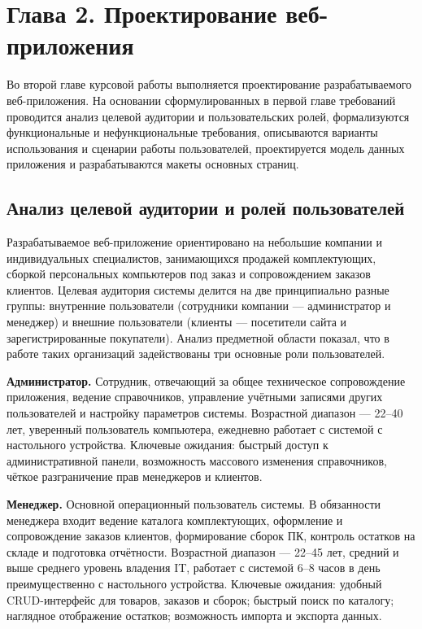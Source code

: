 \documentclass[14pt, a4paper]{extarticle}
\begin{document}
\section*{Глава 2. Проектирование веб-приложения}

Во второй главе курсовой работы выполняется проектирование разрабатываемого веб-приложения. На основании сформулированных в первой главе требований проводится анализ целевой аудитории и пользовательских ролей, формализуются функциональные и нефункциональные требования, описываются варианты использования и сценарии работы пользователей, проектируется модель данных приложения и разрабатываются макеты основных страниц.

\subsection{Анализ целевой аудитории и ролей пользователей}

Разрабатываемое веб-приложение ориентировано на небольшие компании и индивидуальных специалистов, занимающихся продажей комплектующих, сборкой персональных компьютеров под заказ и сопровождением заказов клиентов. Целевая аудитория системы делится на две принципиально разные группы: внутренние пользователи (сотрудники компании --- администратор и менеджер) и внешние пользователи (клиенты --- посетители сайта и зарегистрированные покупатели). Анализ предметной области показал, что в работе таких организаций задействованы три основные роли пользователей.

\textbf{Администратор.} Сотрудник, отвечающий за общее техническое сопровождение приложения, ведение справочников, управление учётными записями других пользователей и настройку параметров системы. Возрастной диапазон --- 22--40 лет, уверенный пользователь компьютера, ежедневно работает с системой с настольного устройства. Ключевые ожидания: быстрый доступ к административной панели, возможность массового изменения справочников, чёткое разграничение прав менеджеров и клиентов.

\textbf{Менеджер.} Основной операционный пользователь системы. В обязанности менеджера входит ведение каталога комплектующих, оформление и сопровождение заказов клиентов, формирование сборок ПК, контроль остатков на складе и подготовка отчётности. Возрастной диапазон --- 22--45 лет, средний и выше среднего уровень владения IT, работает с системой 6--8 часов в день преимущественно с настольного устройства. Ключевые ожидания: удобный CRUD-интерфейс для товаров, заказов и сборок; быстрый поиск по каталогу; наглядное отображение остатков; возможность импорта и экспорта данных.
\end{document}
